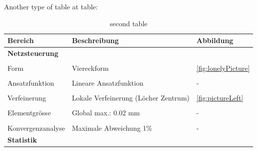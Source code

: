Another type of table at table:

\begin{table}[H]
    \centering
    \caption{second table}
    \label{tab:second table}
    \begin{tabular}{@{}lll@{}}
    \toprule
    Bereich                 & Beschreibung                                                                  & Abbildung                     \\ \midrule
    \textbf{Netzsteuerung}  &                                                                               &                               \\
                            &                                                                               &                               \\
    Form                    & Viereckform                                                                   & \ref{fig:lonelyPicture}       \\
                            &                                                                               &                               \\
    Ansatzfunktion          & Lineare Ansatzfunktion                                                        & -                             \\
                            &                                                                               &                               \\
    Verfeinerung            & Lokale Verfeinerung (Löcher Zentrum)                                          & \ref{fig:pictureLeft}         \\
                            &                                                                               &                               \\
    Elementgrösse           & Global max.: 0.02 mm                                                          & -                            \\
                            &                                                                               &                               \\
    Konvergenzanalyse       & Maximale Abweichung 1\%                                                       & -                             \\ \midrule
    \textbf{Statistik}      &                                                                               &                               \\

\end{tabular}
\end{table}
